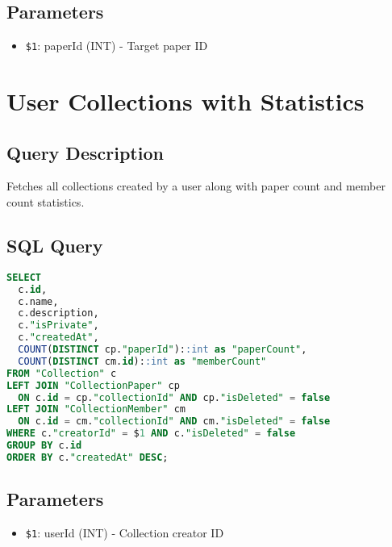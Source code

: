 \subsection{Parameters}
\begin{itemize}[leftmargin=*,topsep=3pt,itemsep=2pt]
    \item \texttt{\$1}: paperId (INT) - Target paper ID
\end{itemize}

\section{User Collections with Statistics}
\label{sec:query-collections}

\subsection{Query Description}
Fetches all collections created by a user along with paper count and member count statistics.

\subsection{SQL Query}
\begin{lstlisting}[language=SQL, caption={User Collections with Aggregated Counts}]
SELECT 
  c.id, 
  c.name, 
  c.description, 
  c."isPrivate", 
  c."createdAt",
  COUNT(DISTINCT cp."paperId")::int as "paperCount",
  COUNT(DISTINCT cm.id)::int as "memberCount"
FROM "Collection" c
LEFT JOIN "CollectionPaper" cp 
  ON c.id = cp."collectionId" AND cp."isDeleted" = false
LEFT JOIN "CollectionMember" cm 
  ON c.id = cm."collectionId" AND cm."isDeleted" = false
WHERE c."creatorId" = $1 AND c."isDeleted" = false
GROUP BY c.id 
ORDER BY c."createdAt" DESC;
\end{lstlisting}

\subsection{Parameters}
\begin{itemize}[leftmargin=*,topsep=3pt,itemsep=2pt]
    \item \texttt{\$1}: userId (INT) - Collection creator ID
\end{itemize}

